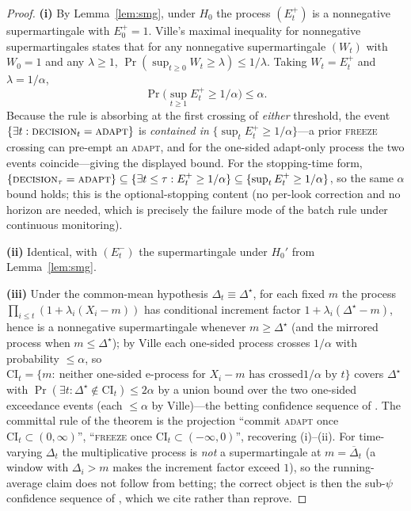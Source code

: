 \begin{proof}
\textbf{(i)} By Lemma~\ref{lem:smg}, under $H_0$ the process $(E_t^{+})$ is a
nonnegative supermartingale with $E_0^{+}=1$. Ville's maximal inequality for
nonnegative supermartingales \cite{ville1939,howard2021timeuniform,ramdas2023}    
states that for any nonnegative supermartingale $(W_t)$ with $W_0=1$ and any
$\lambda\ge1$, $\Pr(\sup_{t\ge0}W_t\ge\lambda)\le 1/\lambda$. Taking
$W_t=E_t^{+}$ and $\lambda=1/\alpha$,
\[
   \Pr\!\Big(\sup_{t\ge1}E_t^{+}\ge 1/\alpha\Big)\le\alpha .
\]
Because the rule is absorbing at the first crossing of \emph{either} threshold, the event
$\{\exists t:\textsc{decision}_t=\textsc{adapt}\}$ is \emph{contained in}
$\{\sup_t E_t^{+}\ge1/\alpha\}$---a prior \textsc{freeze} crossing can pre-empt an
\textsc{adapt}, and for the one-sided adapt-only process the two events coincide---giving the displayed bound. For the
stopping-time form, $\{\textsc{decision}_\tau=\textsc{adapt}\}\subseteq\{\exists
t\le\tau:E_t^{+}\ge1/\alpha\}\subseteq\{\sup_t E_t^{+}\ge1/\alpha\}$, so the same
$\alpha$ bound holds; this is the optional-stopping content (no per-look
correction and no horizon are needed, which is precisely the failure mode of the
batch rule under continuous monitoring).

\textbf{(ii)} Identical, with $(E_t^{-})$ the supermartingale under $H_0'$ from
Lemma~\ref{lem:smg}.

\textbf{(iii)} Under the common-mean hypothesis $\Delta_t\equiv\Delta^\star$, for
each fixed $m$ the process $\prod_{i\le t}(1+\lambda_i(X_i-m))$ has conditional
increment factor $1+\lambda_i(\Delta^\star-m)$, hence is a nonnegative
supermartingale whenever $m\ge\Delta^\star$ (and the mirrored process when
$m\le\Delta^\star$); by Ville each one-sided process crosses $1/\alpha$ with
probability $\le\alpha$, so
$\mathrm{CI}_t=\{m:\ \text{neither one-sided e-process for }X_i-m\text{ has crossed
}1/\alpha\text{ by }t\}$ covers $\Delta^\star$ with
$\Pr(\exists t:\Delta^\star\notin\mathrm{CI}_t)\le2\alpha$ by a union bound over the
two one-sided exceedance events (each $\le\alpha$ by Ville)---the betting
confidence sequence of \cite{waudbysmith2024betting}. The committal rule of the
theorem is the projection ``commit \textsc{adapt} once
$\mathrm{CI}_t\subset(0,\infty)$'', ``\textsc{freeze} once
$\mathrm{CI}_t\subset(-\infty,0)$'', recovering (i)--(ii). For time-varying
$\Delta_t$ the multiplicative process is \emph{not} a supermartingale at
$m=\overline{\Delta}_t$ (a window with $\Delta_i>m$ makes the increment factor
exceed $1$), so the running-average claim does not follow from betting; the
correct object is then the sub-$\psi$ confidence sequence of
\cite{howard2021timeuniform}, which we cite rather than reprove.


\end{proof}
